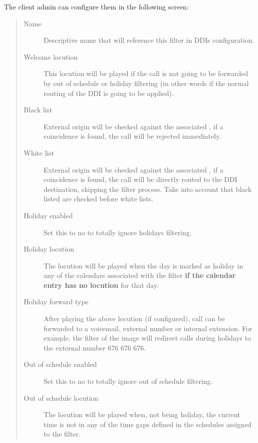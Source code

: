 \documentclass[letterpaper,10pt,spanish]{sphinxmanual}
\begin{document}
The client admin can configure them in the following screen:
\begin{quote}
\begin{description}
\item[{Name}] \leavevmode
Descriptive name that will reference this filter in DDIs configuration.

\item[{Welcome locution}] \leavevmode
This locution will be played if the call is not going to be
forwarded by out of schedule or holiday filtering (in other words if
the normal routing of the DDI is going to be applied).

\item[{Black list}] \leavevmode
External origin will be checked against the associated {\hyperref[administration_portal/client/vpbx/routing_tools/match_lists:match\string-lists]{}},
if a coincidence is found, the call will be rejected immediately.

\item[{White list}] \leavevmode
External origin will be checked against the associated {\hyperref[administration_portal/client/vpbx/routing_tools/match_lists:match\string-lists]{}},
if a coincidence is found, the call will be directly routed to the DDI
destination, skipping the filter process. Take into account that black
listed are checked before white lists.

\item[{Holiday enabled}] \leavevmode
Set this to no to totally ignore holidays filtering.

\item[{Holiday locution}] \leavevmode
The locution will be  played when the day is marked as holiday in any
of the calendars associated with the filter \textbf{if the calendar entry has
no locution} for that day.

\item[{Holiday forward type}] \leavevmode
After playing the above locution (if configured), call can be forwarded
to a voicemail, external number or internal extension. For example, the
filter of the image will redirect calls during holidays to the external
number 676 676 676.

\item[{Out of schedule enabled}] \leavevmode
Set this to no to totally ignore out of schedule filtering.

\item[{Out of schedule locution}] \leavevmode
The locution will be played when, not being holiday, the current time
is not in any of the time gaps defined in the schedules assigned to the
filter.


\end{description}
\end{quote}
\end{document}
